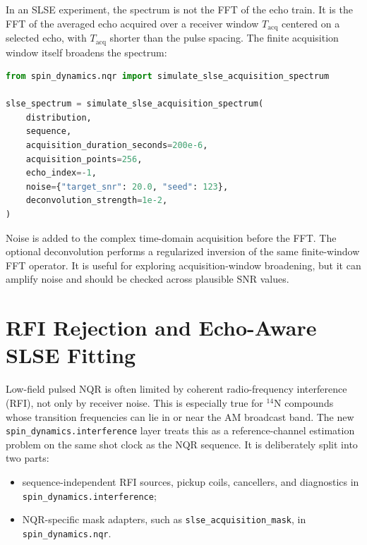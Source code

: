 \documentclass[11pt,oneside]{report}
\newcommand{\code}[1]{\texttt{#1}}
\begin{document}
In an SLSE experiment, the spectrum is not the FFT of the echo train. It is the
FFT of the averaged echo acquired over a receiver window \(T_{\mathrm{acq}}\)
centered on a selected echo, with \(T_{\mathrm{acq}}\) shorter than the pulse
spacing. The finite acquisition window itself broadens the spectrum:

\begin{lstlisting}[language=Python]
from spin_dynamics.nqr import simulate_slse_acquisition_spectrum

slse_spectrum = simulate_slse_acquisition_spectrum(
    distribution,
    sequence,
    acquisition_duration_seconds=200e-6,
    acquisition_points=256,
    echo_index=-1,
    noise={"target_snr": 20.0, "seed": 123},
    deconvolution_strength=1e-2,
)
\end{lstlisting}

Noise is added to the complex time-domain acquisition before the FFT. The
optional deconvolution performs a regularized inversion of the same finite-window
FFT operator. It is useful for exploring acquisition-window broadening, but it
can amplify noise and should be checked across plausible SNR values.

\section{RFI Rejection and Echo-Aware SLSE Fitting}

Low-field pulsed NQR is often limited by coherent radio-frequency interference
(RFI), not only by receiver noise. This is especially true for
\({}^{14}\mathrm{N}\) compounds whose transition frequencies can lie in or near
the AM broadcast band. The new \code{spin\_dynamics.interference} layer treats
this as a reference-channel estimation problem on the same shot clock as the
NQR sequence. It is deliberately split into two parts:

\begin{itemize}
  \item sequence-independent RFI sources, pickup coils, cancellers, and
  diagnostics in \code{spin\_dynamics.\allowbreak interference};
  \item NQR-specific mask adapters, such as \code{slse\_acquisition\_mask}, in
  \code{spin\_dynamics.nqr}.
\end{itemize}
\end{document}
